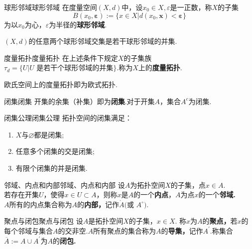 \documentclass{ctexart}
\begin{document}
\begin{定义}{球形邻域}{球形邻域}
	在度量空间$(X,d)$中，设$x_0\in X, \varepsilon$是一正数，称$X$的子集
	$$
	B(x_0,\boldsymbol{\varepsilon}):=\{x\in X|d(x_0,\boldsymbol{x})<\boldsymbol{\varepsilon}\}
	$$
	为以$x_0$为心，$\varepsilon$为半径的\textbf{球形邻域}.
\end{定义}
\begin{定理}{}{}
	$(X,d)$的任意两个球形邻域交集是若干球形邻域的并集.
\end{定理}
\begin{定义}{度量拓扑}{度量拓扑}
	在上述条件下规定$X$的子集族$\tau_d=\lbrace U|U\text{ 是若干个球形邻域的并集}\rbrace.$称为$X$上的\textbf{度量拓扑}.
\end{定义}
\begin{提示}
	欧氏空间上的度量拓扑即为欧式拓扑.
\end{提示}
\begin{定义}{闭集}{闭集}
	开集的余集（补集）即为\textbf{闭集}.对于开集$A$，集合$A^c$为闭集.
\end{定义}
\begin{结论}{闭集公理}{闭集公理}
	拓扑空间的闭集满足：
	\begin{enumerate}[label=(\arabic*)]
		\item $X$与$\varnothing$都是闭集;
		\item 任意多个闭集的交是闭集;
		\item 有限个闭集的并是闭集.
	\end{enumerate}
\end{结论}
\begin{定义}{邻域、内点和内部}{邻域、内点和内部}
	设$A$为拓扑空间$X$的子集，点$x\in A.$\vspace{5pt}\\
	若存在开集$U$，使得$x\in U \subset A$，则称$x$是$A$的一个\textbf{内点}，$A$为点$x$的一个\textbf{邻域.}\\$A$所有的内点集合称为$A$的\textbf{内部，}记作$\mathring{A}\text{(或 }A^{\circ}).$	
\end{定义}
\begin{定义}{聚点与闭包}{聚点与闭包}
	设$A$是拓扑空间$X$的子集，$x \in X.$
	称$x$为$A$的\textbf{聚点，}若$x$的每个邻域与集合$A$的交非空.$A$所有聚点的集合称为$A$的\textbf{导集，}记作$A^{\prime}.$称集合$\overline{A}:=A\cup A^{\prime}$为$A$的\textbf{闭包.}
\end{定义}
\end{document}
